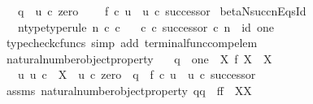 \begin{isabellebody}
\ \ \ q\ {\isacharequal}{\kern0pt}\ u\ {\isasymcirc}\isactrlsub c\ zero\ {\isasymand}\isanewline
\ \ \ f\ {\isasymcirc}\isactrlsub c\ u\ {\isacharequal}{\kern0pt}\ u\ {\isasymcirc}\isactrlsub c\ successor{\isacharparenright}{\kern0pt}{\isachardoublequoteclose}\isanewline
\isanewline
{}\isamarkupfalse%
\ beta{\isacharunderscore}{\kern0pt}N{\isacharunderscore}{\kern0pt}succ{\isacharunderscore}{\kern0pt}nEqs{\isacharunderscore}{\kern0pt}Id{}{\isacharcolon}{\kern0pt}\isanewline
\ \ \ n{\isacharunderscore}{\kern0pt}type{\isacharbrackleft}{\kern0pt}type{\isacharunderscore}{\kern0pt}rule{\isacharbrackright}{\kern0pt}{\isacharcolon}{\kern0pt}\ {\isachardoublequoteopen}n\ {\isasymin}\isactrlsub c\ {\isasymnat}\isactrlsub c{\isachardoublequoteclose}\isanewline
\ \ \ {\isachardoublequoteopen}{\isasymbeta}\isactrlbsub {\isasymnat}\isactrlsub c\isactrlesub \ {\isasymcirc}\isactrlsub c\ successor\ {\isasymcirc}\isactrlsub c\ n\ {\isacharequal}{\kern0pt}\ id\ one{\isachardoublequoteclose}\isanewline
%
\isadelimproof
\ \ %
\endisadelimproof
%
\isatagproof
{}\isamarkupfalse%
\ {\isacharparenleft}{\kern0pt}typecheck{\isacharunderscore}{\kern0pt}cfuncs{\isacharcomma}{\kern0pt}\ simp\ add{\isacharcolon}{\kern0pt}\ terminal{\isacharunderscore}{\kern0pt}func{\isacharunderscore}{\kern0pt}comp{\isacharunderscore}{\kern0pt}elem{\isacharparenright}{\kern0pt}%
\endisatagproof
{\isafoldproof}%
%
\isadelimproof
\isanewline
%
\endisadelimproof
\isanewline
{}\isamarkupfalse%
\ natural{\isacharunderscore}{\kern0pt}number{\isacharunderscore}{\kern0pt}object{\isacharunderscore}{\kern0pt}property{}{\isacharcolon}{\kern0pt}\isanewline
\ \ \ {\isachardoublequoteopen}q\ {\isacharcolon}{\kern0pt}\ one\ {\isasymrightarrow}\ X{\isachardoublequoteclose}\ {\isachardoublequoteopen}f{\isacharcolon}{\kern0pt}\ X\ {\isasymrightarrow}\ X{\isachardoublequoteclose}\isanewline
\ \ \ {\isachardoublequoteopen}{\isasymexists}{\isacharbang}{\kern0pt}u{\isachardot}{\kern0pt}\ u{\isacharcolon}{\kern0pt}\ {\isasymnat}\isactrlsub c\ {\isasymrightarrow}\ X\ {\isasymand}\ u\ {\isasymcirc}\isactrlsub c\ zero\ {\isacharequal}{\kern0pt}\ q\ {\isasymand}\ f\ {\isasymcirc}\isactrlsub c\ u\ {\isacharequal}{\kern0pt}\ u\ {\isasymcirc}\isactrlsub c\ successor{\isachardoublequoteclose}\isanewline
%
\isadelimproof
\ \ %
\endisadelimproof
%
\isatagproof
{}\isamarkupfalse%
\ assms\ natural{\isacharunderscore}{\kern0pt}number{\isacharunderscore}{\kern0pt}object{\isacharunderscore}{\kern0pt}property{\isacharbrackleft}{\kern0pt}\ q{\isacharequal}{\kern0pt}q{\isacharcomma}{\kern0pt}\ \ f{\isacharequal}{\kern0pt}f{\isacharcomma}{\kern0pt}\ \ X{\isacharequal}{\kern0pt}X{\isacharbrackright}{\kern0pt}\isanewline

\end{isabellebody}
